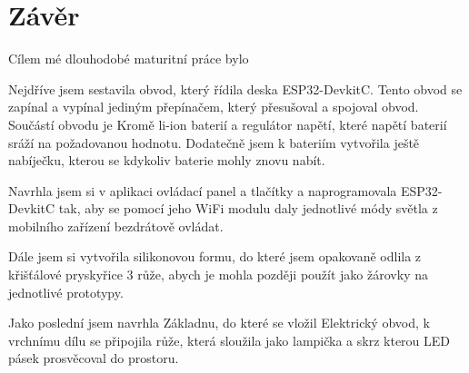 \chapter{Závěr}
Cílem mé dlouhodobé maturitní práce bylo

Nejdříve jsem sestavila obvod, který řídila deska ESP32-DevkitC. Tento obvod se zapínal a vypínal jediným přepínačem, který přesušoval a spojoval obvod. Součástí obvodu je Kromě li-ion baterií a regulátor napětí, které napětí baterií sráží na požadovanou hodnotu. Dodatečně jsem k bateriím vytvořila ještě nabíječku, kterou se kdykoliv baterie mohly znovu nabít. 

Navrhla jsem si v aplikaci ovládací panel a tlačítky a naprogramovala ESP32-DevkitC tak, aby se pomocí jeho WiFi modulu daly jednotlivé módy světla z mobilního zařízení bezdrátově ovládat.  

Dále jsem si vytvořila silikonovou formu, do které jsem opakovaně odlila z křišťálové pryskyřice 3 růže, abych je mohla později použít jako žárovky na jednotlivé prototypy. 

Jako poslední jsem navrhla Základnu, do které se vložil Elektrický obvod, k vrchnímu dílu se připojila růže, která sloužila jako lampička a skrz kterou LED pásek prosvěcoval do prostoru.









 

